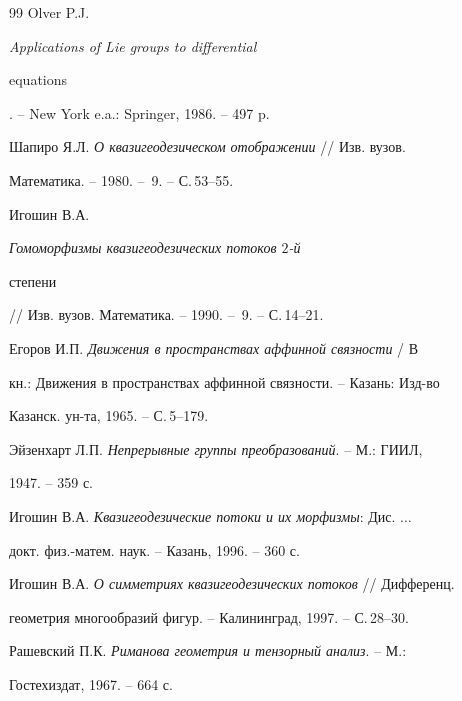 \begin{thebibliography}{99}
Olver P.J. {\em Applications of Lie groups to differential


equations}. -- New York e.a.: Springer, 1986. -- 497 p.




Шапиро Я.Л. {\em О квазигеодезическом отображении} // Изв. вузов.


Математика. -- 1980. -- \No\,9. -- С.\,53--55.




Игошин В.А. {\em Гомоморфизмы квазигеодезических потоков $2$-й


степени} // Изв. вузов. Математика. -- 1990. -- \No\,9. -- С.\,14--21.




Егоров И.П. {\em Движения в пространствах аффинной связности} / В


кн.: Движения в пространствах аффинной связности. -- Казань: Изд-во


Казанск. ун-та, 1965. -- С.\,5--179.




Эйзенхарт Л.П. {\em Непрерывные группы преобразований}. -- М.: ГИИЛ,


1947. -- 359 с.




Игошин В.А. {\em Квазигеодезические потоки и их морфизмы}: Дис. $\dotsc$


докт. физ.-матем. наук. -- Казань, 1996. -- 360 с.




Игошин В.А. {\em О симметриях квазигеодезических потоков} // Дифференц.


геометрия многообразий фигур. -- Калининград, 1997. -- С.\,28--30.




Рашевский П.К. {\em Риманова геометрия и тензорный анализ}. -- М.:


Гостехиздат, 1967. -- 664 с.





\end{thebibliography}





\vskip 2cm












\label{end}






